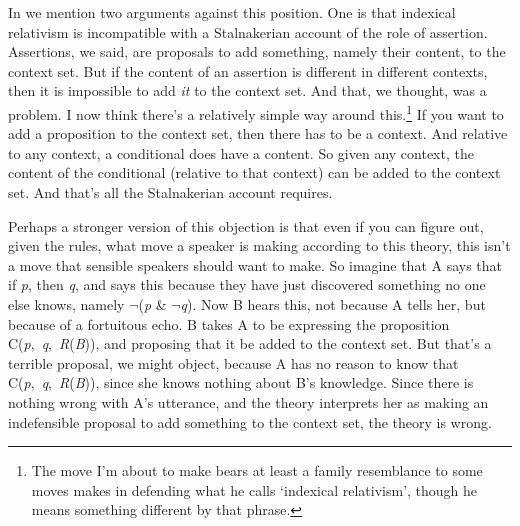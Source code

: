 In \citet{Egan2005-EGAEMI} we mention two arguments against this position. One is that indexical relativism is incompatible with a Stalnakerian account of the role of assertion. Assertions, we said, are proposals to add something, namely their content, to the context set. But if the content of an assertion is different in different contexts, then it is impossible to add \textit{it} to the context set. And that, we thought, was a problem. I now think there's a relatively simple way around this.\footnote{ The move I'm about to make bears at least a family resemblance to some moves \citet{LopezDeSa2008b} makes in defending what he calls `indexical relativism', though he means something different by that phrase.} If you want to add a proposition to the context set, then there has to be a context. And relative to any context, a conditional does have a content. So given any context, the content of the conditional (relative to that context) can be added to the context set. And that's all the Stalnakerian account requires.

Perhaps a stronger version of this objection is that even if you can figure out, given the rules, what move a speaker is making according to this theory, this isn't a move that sensible speakers should want to make. So imagine that A says that if \textit{p}, then \textit{q}, and says this because they have just discovered something no one else knows, namely \(\neg\){}(\textit{p} \& \(\neg\){}\textit{q}). Now B hears this, not because A tells her, but because of a fortuitous echo. B takes A to be expressing the proposition C(\textit{p},~\textit{q},~\textit{R}(\textit{B})), and proposing that it be added to the context set. But that's a terrible proposal, we might object, because A has no reason to know that C(\textit{p},~\textit{q},~\textit{R}(\textit{B})), since she knows nothing about B's knowledge. Since there is nothing wrong with A's utterance, and the theory interprets her as making an indefensible proposal to add something to the context set, the theory is wrong.

